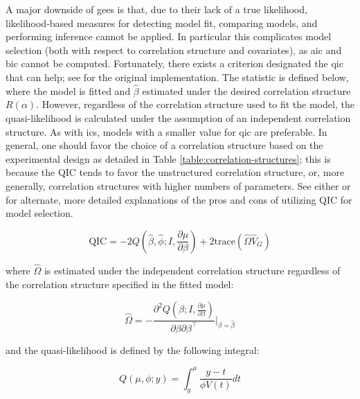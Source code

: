 \documentclass{report}
\begin{document}
A major downside of \glspl{gee} is that, due to their lack of a true likelihood, likelihood-based measures for detecting model fit, comparing models, and performing inference cannot be applied. In particular this complicates model selection (both with respect to correlation structure and covariates), as \gls{aic} and \gls{bic} cannot be computed. Fortunately, there exists a criterion designated the \gls{qic} that can help; see \cite{pan_akaikes_2001} for the original implementation. The statistic is defined below, where the model is fitted and $\hat{\beta}$ estimated under the desired correlation structure $R(\alpha)$. However, regardless of the correlation structure used to fit the model, the quasi-likelihood is calculated under the assumption of an independent correlation structure. As with \glspl{ic}, models with a smaller value for \gls{qic} are preferable. In general, one should favor the choice of a correlation structure based on the experimental design as detailed in Table \ref{table:correlation-structures}; this is because the QIC tends to favor the unstructured correlation structure, or, more generally, correlation structures with higher numbers of parameters. See either \cite{wang_perils_2015} or \cite[Chapter~4.1]{hardin_generalized_2012} for alternate, more detailed explanations of the pros and cons of utilizing QIC for model selection.

\begin{equation}\label{eq:glm-gee-qic-1}
    \text{QIC} = -2Q\left(\hat{\beta}, \hat{\phi}; I, \frac{\partial\mu}{\partial\beta}\right) + 2 \text{trace}\left(\hat{\Omega}\hat{V}_G\right)
\end{equation}

where $\hat{\Omega}$ is estimated under the independent correlation structure regardless of the correlation structure specified in the fitted model:

\begin{equation}\label{eq:glm-gee-qic-2}
    \hat{\Omega} = -\frac{\partial^2Q\left(\beta; I, \frac{\partial\mu}{\partial\beta}\right)}{\partial\beta\partial\beta^\intercal} \bigg |_{\beta = \hat{\beta}}
\end{equation}

and the quasi-likelihood is defined by the following integral:

\begin{equation}\label{eq:glm-gee-qic-3}
    Q(\mu, \phi; y) = \int_y^\mu \frac{y - t}{\phi V(t)} dt
\end{equation}
\end{document}
